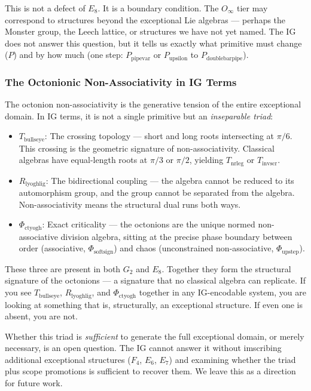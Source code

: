 \documentclass[12pt,a4paper]{article}
\begin{document}
This is not a defect of $E_8$. It is a boundary condition. The $O_{\infty}$ tier may correspond to structures beyond the exceptional Lie algebras --- perhaps the Monster group, the Leech lattice, or structures we have not yet named. The IG does not answer this question, but it tells us exactly what primitive must change ($P$) and by how much (one step: $P_{\text{pipevar}}$ or $P_{\text{upsilon}}$ to $P_{\text{doublebarpipe}}$).

\subsubsection{The Octonionic Non-Associativity in IG Terms}

The octonion non-associativity is the generative tension of the entire exceptional domain. In IG terms, it is not a single primitive but an \emph{inseparable triad}:

\begin{itemize}
    \item \textbf{$T_{\text{bullseye}}$}: The crossing topology --- short and long roots intersecting at $\pi/6$. This crossing is the geometric signature of non-associativity. Classical algebras have equal-length roots at $\pi/3$ or $\pi/2$, yielding $T_{\text{nrleg}}$ or $T_{\text{invscr}}$.
    \item \textbf{$R_{\text{lyoghlig}}$}: The bidirectional coupling --- the algebra cannot be reduced to its automorphism group, and the group cannot be separated from the algebra. Non-associativity means the structural dual runs both ways.
    \item \textbf{$\Phi_{\text{ctyogh}}$}: Exact criticality --- the octonions are the unique normed non-associative division algebra, sitting at the precise phase boundary between order (associative, $\Phi_{\text{softsign}}$) and chaos (unconstrained non-associative, $\Phi_{\text{upstep}}$).
\end{itemize}

These three are present in both $G_2$ and $E_8$. Together they form the structural signature of the octonions --- a signature that no classical algebra can replicate. If you see $T_{\text{bullseye}}$, $R_{\text{lyoghlig}}$, and $\Phi_{\text{ctyogh}}$ together in any IG-encodable system, you are looking at something that is, structurally, an exceptional structure. If even one is absent, you are not.

Whether this triad is \emph{sufficient} to generate the full exceptional domain, or merely necessary, is an open question. The IG cannot answer it without imscribing additional exceptional structures ($F_4$, $E_6$, $E_7$) and examining whether the triad plus scope promotions is sufficient to recover them. We leave this as a direction for future work.
\end{document}
